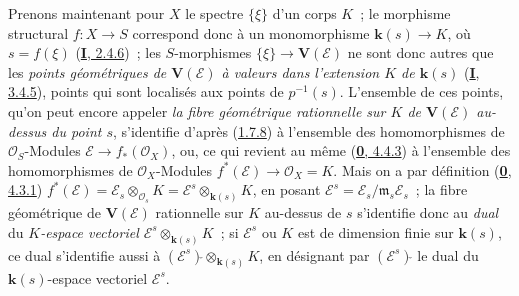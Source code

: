\begin{env}[1.7.10]
\label{II.1.7.10-fr}
Prenons maintenant pour $X$ le spectre $\{\xi\}$ d'un corps $K$~; le
morphisme structural $f:X\to S$ correspond donc à un monomorphisme
$\boldsymbol{k}(s)\to K$, où $s=f(\xi)$
(\hyperref[I.2.4.6-fr]{\textbf{I}, 2.4.6})~; les $S$-morphismes
$\{\xi\}\to\mathbf{V}(\mathcal{E})$ ne sont donc autres que les
\emph{points géométriques de $\mathbf{V}(\mathcal{E})$ à valeurs dans
l'extension $K$ de $\boldsymbol{k}(s)$} (\hyperref[I.3.4.5-fr]{\textbf{I}, 3.4.5}), points qui
sont localisés aux points de $p^{-1}(s)$. L'ensemble de ces points, qu'on
peut encore appeler \emph{la fibre géométrique rationnelle sur $K$ de
$\mathbf{V}(\mathcal{E})$ au-dessus du point $s$}, s'identifie d'après
(\hyperref[II.1.7.8-fr]{1.7.8}) à l'ensemble des homomorphismes de
$\mathcal{O}_S$-Modules
$\mathcal{E}\to f_*(\mathcal{O}_X)$, ou, ce qui revient au même
(\hyperref[0.4.4.3-fr]{\textbf{0}, 4.4.3}) à l'ensemble des homomorphismes de
$\mathcal{O}_X$-Modules
$f^*(\mathcal{E})\to\mathcal{O}_X=K$. Mais on a par définition
(\hyperref[0.4.3.1-fr]{\textbf{0}, 4.3.1})
$f^*(\mathcal{E})=\mathcal{E}_s\otimes_{\mathcal{O}_s}K
=\mathcal{E}^s\otimes_{\boldsymbol{k}(s)}K$, en posant
$\mathcal{E}^s=\mathcal{E}_s/\mathfrak{m}_s\mathcal{E}_s$~; la fibre
géométrique de $\mathbf{V}(\mathcal{E})$ rationnelle sur $K$ au-dessus de
$s$ s'identifie donc au \emph{dual} du \emph{$K$-espace vectoriel
$\mathcal{E}^s\otimes_{\boldsymbol{k}(s)}K$}~; si $\mathcal{E}^s$ ou $K$ est de
dimension finie sur $\boldsymbol{k}(s)$, ce dual s'identifie aussi à
$(\mathcal{E}^s)\check{}\otimes_{\boldsymbol{k}(s)}K$, en désignant par
$(\mathcal{E}^s)\check{}$ le dual du $\boldsymbol{k}(s)$-espace vectoriel
$\mathcal{E}^s$.
\end{env}

